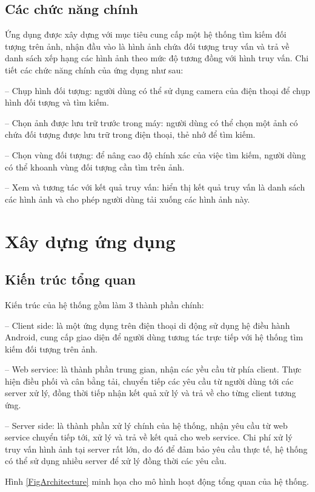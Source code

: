 	\subsection{Các chức năng chính}
Ứng dụng được xây dựng với mục tiêu cung cấp một hệ thống tìm kiếm đối tượng trên ảnh, nhận đầu vào là hình ảnh chứa đối tượng truy vấn và trả về danh sách xếp hạng các hình ảnh theo mức độ tương đồng với hình truy vấn. Chi tiết các chức năng chính của ứng dụng như sau:

-- Chụp hình đối tượng: người dùng có thể sử dụng camera của điện thoại để chụp hình đối tượng và tìm kiếm.

-- Chọn ảnh được lưu trữ trước trong máy: người dùng có thể chọn một ảnh có chứa đối tượng được lưu trữ trong điện thoại, thẻ nhớ để tìm kiếm.

-- Chọn vùng đối tượng: để nâng cao độ chính xác của việc tìm kiếm, người dùng có thể khoanh vùng đối tượng cần tìm trên ảnh.

-- Xem và tương tác với kết quả truy vấn: hiển thị kết quả truy vấn là danh sách các hình ảnh và cho phép người dùng tải xuống các hình ảnh này.

\section{Xây dựng ứng dụng}
\label{c5-thietke}

	\subsection{Kiến trúc tổng quan}
Kiến trúc của hệ thống gồm làm 3 thành phần chính:

-- Client side: là một ứng dụng trên điện thoại di động sử dụng hệ điều hành Android, cung cấp giao diện để người dùng tương tác trực tiếp với hệ thống tìm kiếm đối tượng trên ảnh.

-- Web service: là thành phần trung gian, nhận các yều cầu từ phía client. Thực hiện điều phối và cân bằng tải, chuyển tiếp các yêu cầu từ người dùng tới các server xử lý, đồng thời tiếp nhận kết quả xử lý và trả về cho từng client tương ứng.

-- Server side: là thành phần xử lý chính của hệ thống, nhận yêu cầu từ web service chuyển tiếp tới, xử lý và trả về kết quả cho web service. Chi phí xử lý truy vấn hình ảnh tại server rất lớn, do đó để đảm bảo yêu cầu thực tế, hệ thống có thể sử dụng nhiều server để xử lý đồng thời các yêu cầu.

Hình \ref{FigArchitecture} minh họa cho mô hình hoạt động tổng quan của hệ thống.

